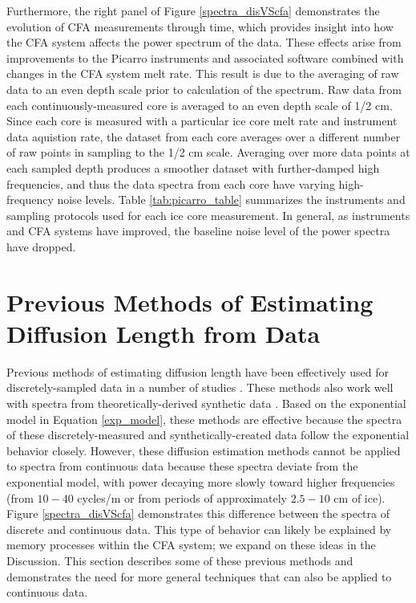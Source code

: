 \documentclass[draft, jgrga]{AGUTeX}
\begin{document}
\begin{article}
Furthermore, the right panel of Figure \ref{spectra_disVScfa} demonstrates the evolution of CFA measurements through time, which provides insight into how the CFA system affects the power spectrum of the data. These effects arise from improvements to the Picarro instruments and associated software combined with changes in the CFA system melt rate. This result is due to the averaging of raw data to an even depth scale prior to calculation of the spectrum. Raw data from each continuously-measured core is averaged to an even depth scale of 1/2 cm. Since each core is measured with a particular ice core melt rate and instrument data aquistion rate, the dataset from each core averages over a different number of raw points in sampling to the 1/2 cm scale. Averaging over more data points at each sampled depth produces a smoother dataset with further-damped high frequencies, and thus the data spectra from each core have varying high-frequency noise levels. Table \ref{tab:picarro_table} summarizes the instruments and sampling protocols used for each ice core measurement. In general, as instruments and CFA systems have improved, the baseline noise level of the power spectra have dropped.



\section{Previous Methods of Estimating Diffusion Length from Data}

Previous methods of estimating diffusion length have been effectively used for discretely-sampled data in a number of studies \citep{Johnsen2000,Simonsen2011,Gkinis2014,vanderWel2015}. These methods also work well with spectra from theoretically-derived synthetic data \citep{Holme2017}. Based on the exponential model in Equation \ref{exp_model}, these methods are effective because the spectra of these discretely-measured and synthetically-created data follow the exponential behavior closely. However, these diffusion estimation methods cannot be applied to spectra from continuous data because these spectra deviate from the exponential model, with power decaying more slowly toward higher frequencies (from $10-40$ cycles/m or from periods of approximately $2.5-10$ cm of ice). Figure \ref{spectra_disVScfa} demonstrates this difference between the spectra of discrete and continuous data. This type of behavior can likely be explained by memory processes within the CFA system; we expand on these ideas in the Discussion.  This section describes some of these previous methods and demonstrates the need for more general techniques that can also be applied to continuous data.


\end{article}
\end{document}
